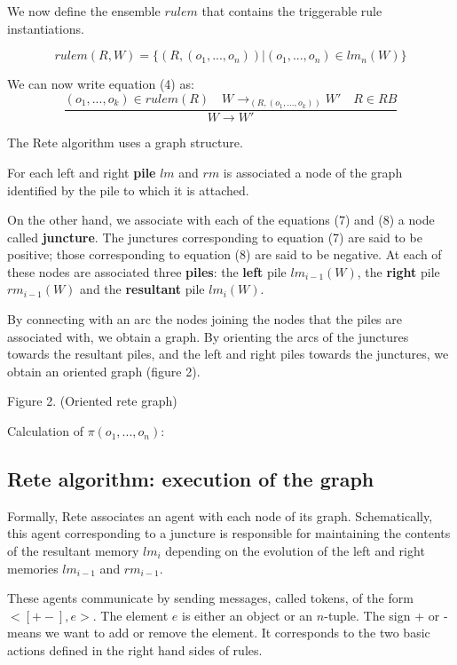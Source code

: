 We now define the ensemble $rulem$ that contains the triggerable rule instantiations.

\begin{equation}
rulem(R, W) = \{ (R, (o_1, ..., o_n)) | (o_1, ..., o_n) \in lm_n(W) \}
\end{equation}

We can now write equation (4) as:
\begin{equation}
\frac{(o_1, ..., o_{k}) \in rulem (R) \quad W \rightarrow_{(R, (o_1, ..., o_k))} W' \quad R \in RB }
{W \rightarrow W'}
\end{equation}

The Rete algorithm uses a graph structure.

For each left and right \textbf{pile} $lm$ and $rm$ is associated a node of the graph identified by the pile to which it is attached.

On the other hand, we associate with each of the equations (7) and (8) a node called \textbf{juncture}.
The junctures corresponding to equation (7) are said to be positive; those corresponding to equation (8)
are said to be negative.  At each of these nodes are associated three \textbf{piles}: the \textbf{left} pile $lm_{i-1} (W)$, the \textbf{right} pile $rm_{i-1} (W)$ and the \textbf{resultant} pile $lm_i (W)$.

By connecting with an arc the nodes joining the nodes that the piles are associated with, we obtain a
graph.  By orienting the arcs of the junctures towards the resultant piles, and the left and right piles towards the junctures, we obtain an oriented graph (figure 2).

Figure 2. (Oriented rete graph)

Calculation of $\pi(o_1, ..., o_n)$:

\subsection{Rete algorithm: execution of the graph}

Formally, Rete associates an agent with each node of its graph. Schematically,
this agent corresponding to a juncture is responsible for maintaining the contents of the
resultant memory $lm_i$ depending on the evolution of the left and right memories $lm_{i-1}$ and $rm_{i-1}$.

These agents communicate by sending messages, called tokens, of the form
$<[+ -], e>$. The element $e$ is either an object or an $n$-tuple. The sign + or - means
we want to add or remove the element. It corresponds to the two basic actions
defined in the right hand sides of rules.

